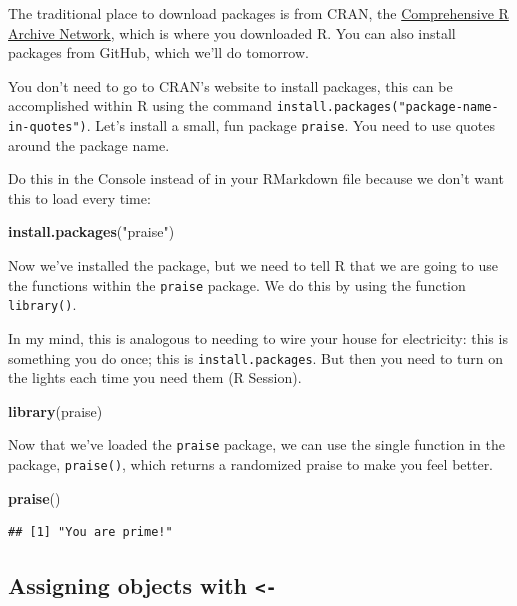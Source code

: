 \documentclass[]{book}
\newenvironment{Shaded}{\begin{snugshade}}{\end{snugshade}}
\newcommand{\KeywordTok}[1]{\textcolor[rgb]{0.13,0.29,0.53}{\textbf{#1}}}
\newcommand{\NormalTok}[1]{#1}
\newcommand{\StringTok}[1]{\textcolor[rgb]{0.31,0.60,0.02}{#1}}
\begin{document}
The traditional place to download packages is from CRAN, the \href{https://cran.r-project.org/}{Comprehensive R Archive Network}, which is where you downloaded R. You can also install packages from GitHub, which we'll do tomorrow.

You don't need to go to CRAN's website to install packages, this can be accomplished within R using the command \texttt{install.packages("package-name-in-quotes")}. Let's install a small, fun package \texttt{praise}. You need to use quotes around the package name.

Do this in the Console instead of in your RMarkdown file because we don't want this to load every time:

\begin{Shaded}
\begin{Highlighting}[]
\KeywordTok{install.packages}\NormalTok{(}\StringTok{"praise"}\NormalTok{)}
\end{Highlighting}
\end{Shaded}

Now we've installed the package, but we need to tell R that we are going to use the functions within the \texttt{praise} package. We do this by using the function \texttt{library()}.

In my mind, this is analogous to needing to wire your house for electricity: this is something you do once; this is \texttt{install.packages}. But then you need to turn on the lights each time you need them (R Session).

\begin{Shaded}
\begin{Highlighting}[]
\KeywordTok{library}\NormalTok{(praise)}
\end{Highlighting}
\end{Shaded}

Now that we've loaded the \texttt{praise} package, we can use the single function in the package, \texttt{praise()}, which returns a randomized praise to make you feel better.

\begin{Shaded}
\begin{Highlighting}[]
\KeywordTok{praise}\NormalTok{()}
\end{Highlighting}
\end{Shaded}

\begin{verbatim}
## [1] "You are prime!"
\end{verbatim}

\hypertarget{assigning-objects-with--}{%
\subsection{\texorpdfstring{Assigning objects with \texttt{\textless{}-}}{Assigning objects with \textless{}-}}\label{assigning-objects-with--}}
\end{document}
